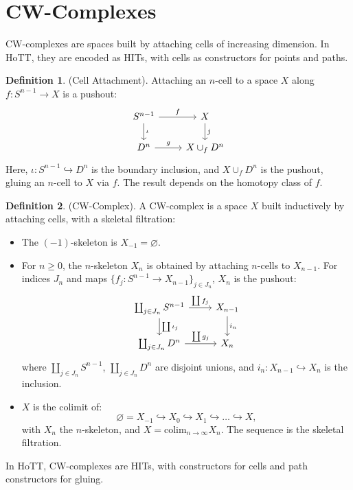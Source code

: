 \documentclass{article}
\theoremstyle{definition}
\newtheorem{definition}{Definition}
\newcommand*{\incmap}{\hookrightarrow}
\begin{document}
\section{CW-Complexes}
CW-complexes are spaces built by attaching cells of increasing
dimension. In HoTT, they are encoded as HITs, with cells as
constructors for points and paths.

\begin{definition} (Cell Attachment). Attaching an \( n \)-cell
to a space \( X \) along \( f : S^{n-1} \to X \) is a pushout:
\[
\begin{tikzcd}
S^{n-1} \arrow[r, "f"] \arrow[d, "\iota"] & X \arrow[d, "j"] \\
D^n \arrow[r, "g"] & X \cup_f D^n
\end{tikzcd}
\]
Here, \( \iota : S^{n-1} \incmap D^n \) is the boundary
inclusion, and \( X \cup_f D^n \) is the pushout, gluing an
\( n \)-cell to \( X \) via \( f \). The result depends on the
homotopy class of \( f \).
\end{definition}

\begin{definition} (CW-Complex). A CW-complex is a space \( X \)
built inductively by attaching cells, with a skeletal
filtration:
\begin{itemize}
    \item The \((-1)\)-skeleton is \( X_{-1} = \varnothing \).
    \item For \( n \geq 0 \), the \( n \)-skeleton \( X_n \) is
      obtained by attaching \( n \)-cells to \( X_{n-1} \). For
      indices \( J_n \) and maps \( \{ f_j : S^{n-1} \to X_{n-1}
      \}_{j \in J_n} \), \( X_n \) is the pushout:
    \[
    \begin{tikzcd}
    \coprod_{j \in J_n} S^{n-1} \arrow[r, "\coprod f_j"] \arrow[d, "\coprod \iota_j"] & X_{n-1} \arrow[d, "i_n"] \\
    \coprod_{j \in J_n} D^n \arrow[r, "\coprod g_j"] & X_n
    \end{tikzcd}
    \]
    where \( \coprod_{j \in J_n} S^{n-1} \), \( \coprod_{j \in
    J_n} D^n \) are disjoint unions, and \( i_n : X_{n-1}
    \incmap X_n \) is the inclusion.
    \item \( X \) is the colimit of:
    \[
    \varnothing = X_{-1} \incmap X_0 \incmap X_1 \incmap \dots
    \incmap X,
    \]
    with \( X_n \) the \( n \)-skeleton, and \( X = \text{colim}_{n
    \to \infty} X_n \). The sequence is the skeletal filtration.
\end{itemize}
In HoTT, CW-complexes are HITs, with constructors for cells and
path constructors for gluing.
\end{definition}
\end{document}
